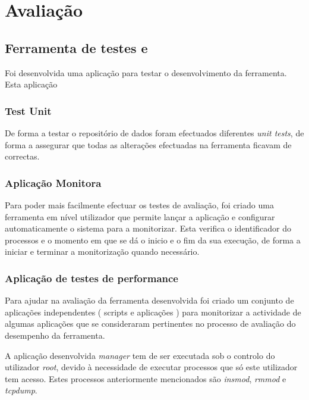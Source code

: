 \chapter{Avaliação}
\label{cap:avaliacao}

\section{Ferramenta de testes e}

Foi desenvolvida uma aplicação para testar o desenvolvimento da ferramenta.
Esta aplicação 

\subsection{Test Unit}

De forma a testar o repositório de dados foram efectuados diferentes \textit{unit tests}, de forma a assegurar que todas as alterações efectuadas na ferramenta ficavam de correctas.

\subsection{Aplicação Monitora}
\label{sub:monitor_app}

Para poder mais facilmente efectuar os testes de avaliação, foi criado uma ferramenta em nível utilizador que permite lançar a aplicação e configurar automaticamente o sistema para a monitorizar. Esta verifica o identificador do processos e o momento em que se dá o inicio e o fim da sua execução, de forma a iniciar e terminar a monitorização quando necessário.

\subsection{Aplicação de testes de performance}

Para ajudar na avaliação da ferramenta desenvolvida foi criado um conjunto de aplicações independentes ( scripts e aplicações ) para monitorizar a actividade de algumas aplicações que se consideraram pertinentes no processo de avaliação do desempenho da ferramenta.

A aplicação desenvolvida \textit{manager} tem de ser executada sob o controlo do utilizador \textit{root}, devido à necessidade de executar processos que só este utilizador tem acesso. Estes processos anteriormente mencionados são \textit{insmod}, \textit{rmmod} e \textit{tcpdump}.

